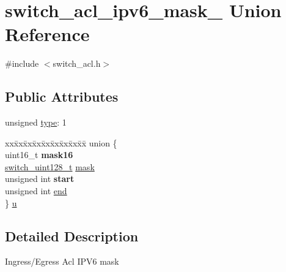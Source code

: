 \hypertarget{unionswitch__acl__ipv6__mask__}{\section{switch\+\_\+acl\+\_\+ipv6\+\_\+mask\+\_\+ Union Reference}
\label{unionswitch__acl__ipv6__mask__}
}


{\ttfamily \#include $<$switch\+\_\+acl.\+h$>$}

\subsection*{Public Attributes}
\begin{DoxyCompactItemize}
\item 
unsigned \hyperlink{unionswitch__acl__ipv6__mask___a28d3925d1cd16105103ec42b57c82eb0}{type}\+: 1
\item 
\begin{tabbing}
xx\=xx\=xx\=xx\=xx\=xx\=xx\=xx\=xx\=\kill
union \{\\
\>uint16\_t {\bfseries mask16}\\
\>\hyperlink{structswitch__uint128__t}{switch\_uint128\_t} \hyperlink{unionswitch__acl__ipv6__mask___ab9cd8578f5fc00ae613bf22aac8a37da}{mask}\\
\>unsigned int {\bfseries start}\\
\>unsigned int \hyperlink{unionswitch__acl__ipv6__mask___aca2c5fc2068fb9bdf27b61a95ef364c4}{end}\\
\} \hyperlink{unionswitch__acl__ipv6__mask___aa7cc95940e7fc130706f0a500b425e3f}{u}\\

\end{tabbing}\end{DoxyCompactItemize}


\subsection{Detailed Description}
Ingress/\+Egress Acl I\+P\+V6 mask 

